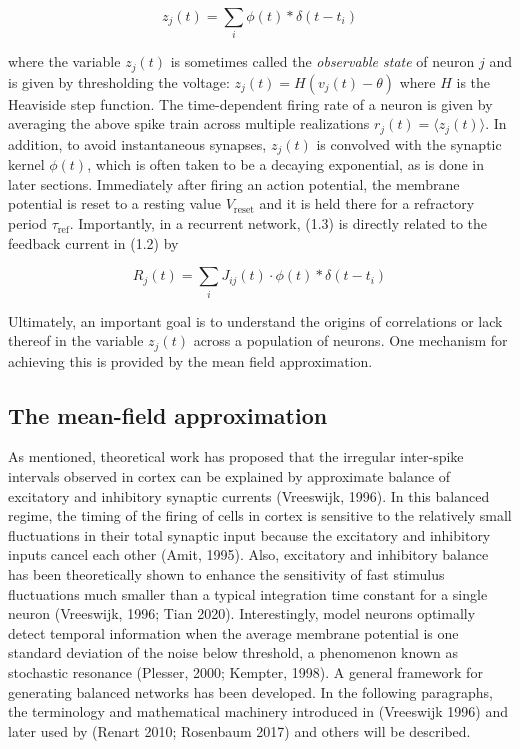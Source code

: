 \documentclass{ucetd}
\begin{document}
\begin{equation}
z_{j}(t) = \sum_{i} \phi(t) * \delta(t-t_{i})
\end{equation}

where the variable $z_{j}(t)$ is sometimes called the \emph{observable state} of neuron $j$ and is given by thresholding the voltage: $z_{j}(t) = H(v_{j}(t) - \theta)$ where $H$ is the Heaviside step function. The time-dependent firing rate of a neuron is given by averaging the above spike train across multiple realizations $r_{j}(t) = \langle z_{j}(t) \rangle$. In addition, to avoid instantaneous synapses, $z_{j}(t)$ is convolved with the synaptic kernel $\phi(t)$, which is often taken to be a decaying exponential, as is done in later sections. Immediately after firing an action potential, the membrane potential is reset to a resting value $V_{\mathrm{reset}}$ and it is held there for a refractory period $\tau_{\mathrm{ref}}$. Importantly, in a recurrent network, (1.3) is directly related to the feedback current in (1.2) by 

\begin{equation}
R_{j}(t) = \sum_{i} J_{ij}(t)\cdot \phi(t) * \delta(t-t_{i})
\end{equation}

Ultimately, an important goal is to understand the origins of correlations or lack thereof in the variable $z_{j}(t)$ across a population of neurons. One mechanism for achieving this is provided by the mean field approximation.

\subsection{The mean-field approximation}

As mentioned, theoretical work has proposed that the irregular inter-spike intervals observed in cortex can be explained by approximate balance of excitatory and inhibitory synaptic currents (Vreeswijk, 1996). In this balanced regime, the timing of the firing of cells in cortex is sensitive to the relatively small fluctuations in their total synaptic input because the excitatory and inhibitory inputs cancel each other (Amit, 1995). Also, excitatory and inhibitory balance has been theoretically shown to enhance the sensitivity of fast stimulus fluctuations much smaller than a typical integration time constant for a single neuron (Vreeswijk, 1996; Tian 2020). Interestingly, model neurons optimally detect temporal information when the average membrane potential is one standard deviation of the noise below threshold, a phenomenon known as stochastic resonance (Plesser, 2000; Kempter, 1998). A general framework for generating balanced networks has been developed. In the following paragraphs, the terminology and mathematical machinery introduced in (Vreeswijk 1996) and later used by (Renart 2010; Rosenbaum 2017) and others will be described.
\end{document}
